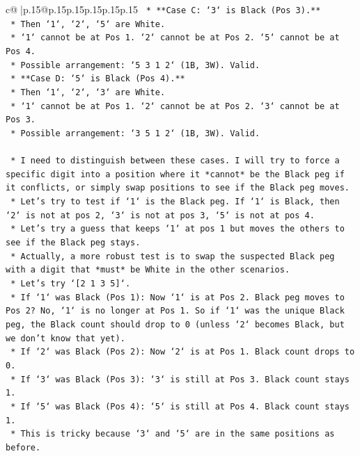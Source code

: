 \documentclass{article}
\begin{document}
{\begin{supertabular}{c@{$\;$}|p{.15\linewidth}@{}p{.15\linewidth}p{.15\linewidth}p{.15\linewidth}p{.15\linewidth}p{.15\linewidth}}
{{{\texttt{        *   **Case C: `3` is Black (Pos 3).**} \\
\texttt{            *   Then `1`, `2`, `5` are White.} \\
\texttt{            *   `1` cannot be at Pos 1. `2` cannot be at Pos 2. `5` cannot be at Pos 4.} \\
\texttt{            *   Possible arrangement: `5 3 1 2` (1B, 3W). Valid.} \\
\texttt{        *   **Case D: `5` is Black (Pos 4).**} \\
\texttt{            *   Then `1`, `2`, `3` are White.} \\
\texttt{            *   `1` cannot be at Pos 1. `2` cannot be at Pos 2. `3` cannot be at Pos 3.} \\
\texttt{            *   Possible arrangement: `3 5 1 2` (1B, 3W). Valid.} \\
\\ 
\texttt{    *   I need to distinguish between these cases. I will try to force a specific digit into a position where it *cannot* be the Black peg if it conflicts, or simply swap positions to see if the Black peg moves.} \\
\texttt{    *   Let's try to test if `1` is the Black peg. If `1` is Black, then `2` is not at pos 2, `3` is not at pos 3, `5` is not at pos 4.} \\
\texttt{    *   Let's try a guess that keeps `1` at pos 1 but moves the others to see if the Black peg stays.} \\
\texttt{    *   Actually, a more robust test is to swap the suspected Black peg with a digit that *must* be White in the other scenarios.} \\
\texttt{    *   Let's try `{[}2 1 3 5{]}`.} \\
\texttt{        *   If `1` was Black (Pos 1): Now `1` is at Pos 2. Black peg moves to Pos 2? No, `1` is no longer at Pos 1. So if `1` was the unique Black peg, the Black count should drop to 0 (unless `2` becomes Black, but we don't know that yet).} \\
\texttt{        *   If `2` was Black (Pos 2): Now `2` is at Pos 1. Black count drops to 0.} \\
\texttt{        *   If `3` was Black (Pos 3): `3` is still at Pos 3. Black count stays 1.} \\
\texttt{        *   If `5` was Black (Pos 4): `5` is still at Pos 4. Black count stays 1.} \\
\texttt{    *   This is tricky because `3` and `5` are in the same positions as before.} \\
}}}
\end{supertabular}}
\end{document}

